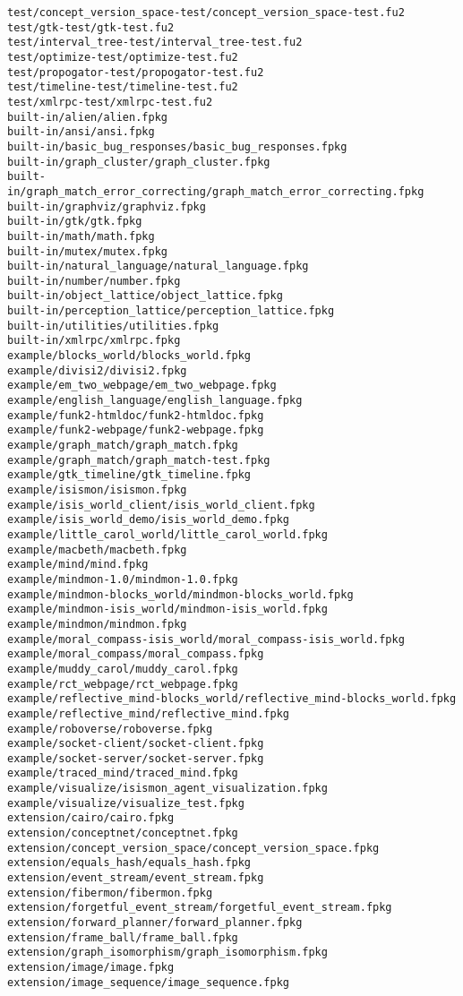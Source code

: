 \begin{lstlisting}
test/concept_version_space-test/concept_version_space-test.fu2
test/gtk-test/gtk-test.fu2
test/interval_tree-test/interval_tree-test.fu2
test/optimize-test/optimize-test.fu2
test/propogator-test/propogator-test.fu2
test/timeline-test/timeline-test.fu2
test/xmlrpc-test/xmlrpc-test.fu2
built-in/alien/alien.fpkg
built-in/ansi/ansi.fpkg
built-in/basic_bug_responses/basic_bug_responses.fpkg
built-in/graph_cluster/graph_cluster.fpkg
built-in/graph_match_error_correcting/graph_match_error_correcting.fpkg
built-in/graphviz/graphviz.fpkg
built-in/gtk/gtk.fpkg
built-in/math/math.fpkg
built-in/mutex/mutex.fpkg
built-in/natural_language/natural_language.fpkg
built-in/number/number.fpkg
built-in/object_lattice/object_lattice.fpkg
built-in/perception_lattice/perception_lattice.fpkg
built-in/utilities/utilities.fpkg
built-in/xmlrpc/xmlrpc.fpkg
example/blocks_world/blocks_world.fpkg
example/divisi2/divisi2.fpkg
example/em_two_webpage/em_two_webpage.fpkg
example/english_language/english_language.fpkg
example/funk2-htmldoc/funk2-htmldoc.fpkg
example/funk2-webpage/funk2-webpage.fpkg
example/graph_match/graph_match.fpkg
example/graph_match/graph_match-test.fpkg
example/gtk_timeline/gtk_timeline.fpkg
example/isismon/isismon.fpkg
example/isis_world_client/isis_world_client.fpkg
example/isis_world_demo/isis_world_demo.fpkg
example/little_carol_world/little_carol_world.fpkg
example/macbeth/macbeth.fpkg
example/mind/mind.fpkg
example/mindmon-1.0/mindmon-1.0.fpkg
example/mindmon-blocks_world/mindmon-blocks_world.fpkg
example/mindmon-isis_world/mindmon-isis_world.fpkg
example/mindmon/mindmon.fpkg
example/moral_compass-isis_world/moral_compass-isis_world.fpkg
example/moral_compass/moral_compass.fpkg
example/muddy_carol/muddy_carol.fpkg
example/rct_webpage/rct_webpage.fpkg
example/reflective_mind-blocks_world/reflective_mind-blocks_world.fpkg
example/reflective_mind/reflective_mind.fpkg
example/roboverse/roboverse.fpkg
example/socket-client/socket-client.fpkg
example/socket-server/socket-server.fpkg
example/traced_mind/traced_mind.fpkg
example/visualize/isismon_agent_visualization.fpkg
example/visualize/visualize_test.fpkg
extension/cairo/cairo.fpkg
extension/conceptnet/conceptnet.fpkg
extension/concept_version_space/concept_version_space.fpkg
extension/equals_hash/equals_hash.fpkg
extension/event_stream/event_stream.fpkg
extension/fibermon/fibermon.fpkg
extension/forgetful_event_stream/forgetful_event_stream.fpkg
extension/forward_planner/forward_planner.fpkg
extension/frame_ball/frame_ball.fpkg
extension/graph_isomorphism/graph_isomorphism.fpkg
extension/image/image.fpkg
extension/image_sequence/image_sequence.fpkg

\end{lstlisting}
